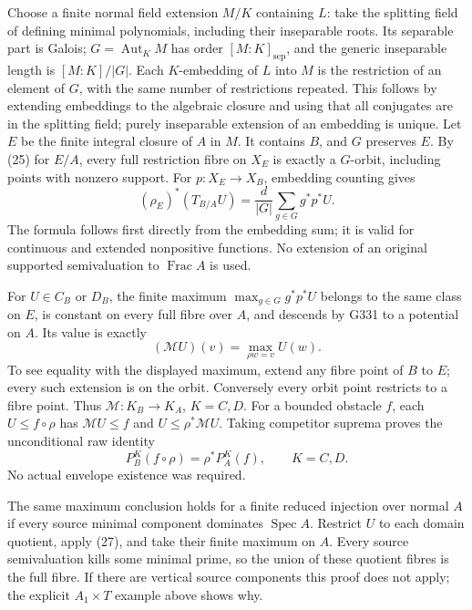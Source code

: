 \documentclass[11pt]{article}
\begin{document}
Choose a finite normal field extension \(M/K\) containing \(L\):
take the splitting field of defining minimal polynomials,
including their inseparable roots. Its separable part is
Galois; \(G=\operatorname{Aut}_K M\) has order
\([M:K]_{\mathrm{sep}}\), and the generic inseparable length is
\([M:K]/|G|\). Each \(K\)-embedding of \(L\) into \(M\) is
the restriction of an element of \(G\), with the same number
of restrictions repeated. This follows by extending embeddings
to the algebraic closure and using that all conjugates are in
the splitting field; purely inseparable extension of an
embedding is unique.
Let \(E\) be the finite integral closure of \(A\) in \(M\).
It contains \(B\), and \(G\) preserves \(E\).
By (25) for \(E/A\), every full restriction fibre on \(X_E\)
is exactly a \(G\)-orbit, including points with nonzero support.
For \(p:X_E\to X_B\), embedding counting gives
\[
 (\rho_E)^*(T_{B/A}U)
       =\frac d{|G|}\sum_{g\in G}g^*p^*U .                   \tag{26}
\]
The formula follows first directly from the embedding sum;
it is valid for continuous and extended nonpositive functions.
No extension of an original supported semivaluation to
\(\operatorname{Frac}A\) is used.

For \(U\in C_B\) or \(D_B\), the finite maximum
\(\max_{g\in G}g^*p^*U\) belongs to the same class on \(E\),
is constant on every full fibre over \(A\), and descends by
G331 to a potential on \(A\). Its value is exactly
\[
 (\mathcal M U)(v)=\max_{\rho w=v}U(w).                        \tag{27}
\]
To see equality with the displayed maximum, extend any fibre
point of \(B\) to \(E\); every such extension is on the orbit.
Conversely every orbit point restricts to a fibre point.
Thus \(\mathcal M:K_B\to K_A\), \(K=C,D\).
For a bounded obstacle \(f\), each \(U\leq f\circ\rho\)
has \(\mathcal M U\leq f\) and \(U\leq\rho^*\mathcal M U\).
Taking competitor suprema proves the unconditional raw identity
\[
 P_B^K(f\circ\rho)=\rho^*P_A^K(f),\qquad K=C,D.                \tag{28}
\]
No actual envelope existence was required.

The same maximum conclusion holds for a finite reduced injection
over normal \(A\) if every source minimal component dominates
\(\operatorname{Spec}A\). Restrict \(U\) to each domain quotient,
apply (27), and take their finite maximum on \(A\).
Every source semivaluation kills some minimal prime, so the
union of these quotient fibres is the full fibre.
If there are vertical source components this proof does not
apply; the explicit \(A_1\times T\) example above shows why.
\end{document}
